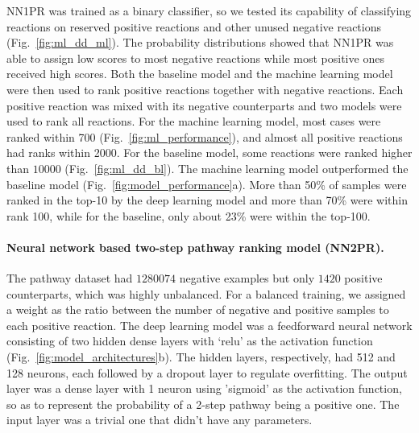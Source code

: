 \documentclass{article}
\begin{document}
NN1PR was trained as a binary classifier, so we tested its capability of classifying reactions on reserved positive reactions and other unused negative reactions (Fig.~\ref{fig:ml_dd_ml}). 
The probability distributions showed that NN1PR was able to assign low scores to most negative reactions while most positive ones received high scores.  
Both the baseline model and the machine learning model were then used to rank positive reactions together with negative reactions.
Each positive reaction was mixed with its negative counterparts and two models were used to rank all reactions. 
For the machine learning model, most cases were ranked within 700 (Fig.~\ref{fig:ml_performance}), and almost all positive reactions had ranks within 2000.
For the baseline model, some reactions were ranked higher than $10000$ (Fig.~\ref{fig:ml_dd_bl}).
The machine learning model outperformed the baseline model (Fig.~\ref{fig:model_performance}a). More than 50\% of samples were ranked in the top-10 by the deep learning model and more than 70\% were within rank 100, while for the baseline, only about 23\% were within the top-100.

\paragraph{Neural network based two-step pathway ranking model (NN2PR).}
The pathway dataset had $1280074$ negative examples but only $1420$ positive counterparts, which was highly unbalanced. 
For a balanced training, we assigned a weight as the ratio between the number of negative and positive samples to each positive reaction. 
The deep learning model was a feedforward neural network consisting of two hidden dense layers with `relu' as the activation function \citep{goodfellow2016deep} (Fig.~\ref{fig:model_architectures}b). 
The hidden layers, respectively, had 512 and 128 neurons, each followed by a dropout layer to regulate overfitting.
The output layer was a dense layer with 1 neuron using 'sigmoid' as the activation function, so as to represent the probability of a 2-step pathway being a positive one. 
The input layer was a trivial one that didn't have any parameters.
\end{document}
